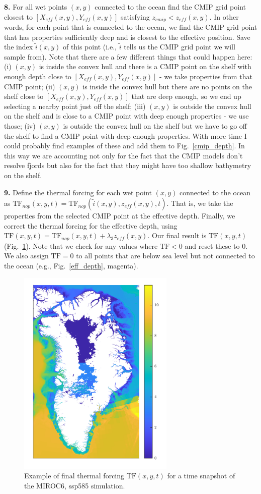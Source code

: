 \documentclass[11pt]{article}
\begin{document}
\textbf{8.} For all wet points $(x,y)$ connected to the ocean find the CMIP grid point closest to $[X_{eff}(x,y), Y_{eff}(x,y)]$ satisfying $z_{cmip}<z_{eff}(x,y)$. In other words, for each point that is connected to the ocean, we find the CMIP grid point that has properties sufficiently deep and is closest to the effective position. Save the index $\tilde{i}(x,y)$ of this point (i.e., $\tilde{i}$ tells us the CMIP grid point we will sample from). Note that there are a few different things that could happen here: (i) $(x,y)$ is inside the convex hull and there is a CMIP point on the shelf with enough depth close to $[X_{eff}(x,y), Y_{eff}(x,y)]$ - we take properties from that CMIP point; (ii) $(x,y)$ is inside the convex hull but there are no points on the shelf close to $[X_{eff}(x,y), Y_{eff}(x,y)]$ that are deep enough, so we end up selecting a nearby point just off the shelf; (iii) $(x,y)$ is outside the convex hull on the shelf and is close to a CMIP point with deep enough properties - we use those; (iv) $(x,y)$ is outside the convex hull on the shelf but we have to go off the shelf to find a CMIP point with deep enough properties. With more time I could probably find examples of these and add them to Fig.~\ref{cmip_depth}. In this way we are accounting not only for the fact that the CMIP models don't resolve fjords but also for the fact that they might have too shallow bathymetry on the shelf.

\textbf{9.} Define the thermal forcing for each wet point $(x,y)$ connected to the ocean as $\text{TF}_{nop}(x,y,t)=\text{TF}_{nop}(\tilde{i}(x,y),z_{eff}(x,y),t)$. That is, we take the properties from the selected CMIP point at the effective depth. Finally, we correct the thermal forcing for the effective depth, using $\text{TF}(x,y,t)=\text{TF}_{nop}(x,y,t)+\lambda_3z_{eff}(x,y)$. Our final result is $\text{TF}(x,y,t)$ (Fig.~\ref{T_example}). Note that we check for any values where $\text{TF}<0$ and reset these to 0. We also assign $\text{TF}=0$ to all points that are below sea level but not connected to the ocean (e.g., Fig.~\ref{eff_depth}, magenta).

\begin{figure}[h!]
\centering
\includegraphics[width=7.5cm]{TF_example.png}
\caption{Example of final thermal forcing $\text{TF}(x,y,t)$ for a time snapshot of the MIROC6, ssp585 simulation.}
\label{T_example}
\end{figure}
\end{document}
